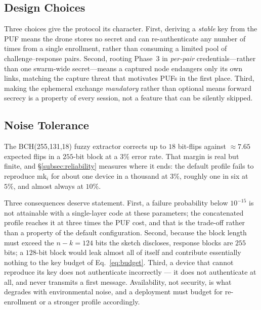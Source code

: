 \documentclass[11pt,a4paper]{article}
\begin{document}
\subsection{Design Choices}
Three choices give the protocol its character. First, deriving a \emph{stable}
key from the PUF means the drone stores no secret and can re-authenticate any
number of times from a single enrollment, rather than consuming a limited pool
of challenge--response pairs. Second, rooting Phase~3 in \emph{per-pair}
credentials---rather than one swarm-wide secret---means a captured node
endangers only its own links, matching the capture threat that motivates PUFs
in the first place. Third, making the ephemeral exchange \emph{mandatory} rather
than optional means forward secrecy is a property of every session, not a
feature that can be silently skipped.

\subsection{Noise Tolerance}
The BCH(255,131,18) fuzzy extractor corrects up to $18$ bit-flips against
$\approx 7.65$ expected flips in a $255$-bit block at a $3\%$ error rate. That
margin is real but finite, and \S\ref{subsec:reliability} measures where it ends:
the default profile fails to reproduce $\text{mk}_i$ for about one device in a
thousand at $3\%$, roughly one in six at $5\%$, and almost always at $10\%$.

Three consequences deserve statement. First, a failure probability below
$10^{-15}$ is not attainable with a single-layer code at these parameters; the
concatenated profile reaches it at three times the PUF cost, and that is the
trade-off rather than a property of the default configuration. Second, because the
block length must exceed the $n-k = 124$ bits the sketch discloses, response blocks
are $255$ bits; a $128$-bit block would leak almost all of itself and contribute
essentially nothing to the key budget of Eq.~\eqref{eq:budget}. Third, a device
that cannot reproduce its key does not authenticate incorrectly --- it does not
authenticate at all, and never transmits a first message. Availability, not
security, is what degrades with environmental noise, and a deployment must budget
for re-enrollment or a stronger profile accordingly.
\end{document}
